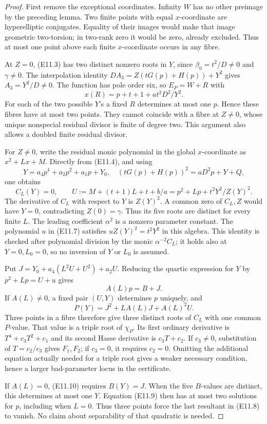 \begin{proof}
First remove the exceptional coordinates. Infinity $W$ has no other
preimage by the preceding lemma. Two finite points with equal
$x$-coordinate are hyperelliptic conjugates. Equality of their images
would make that image geometric two-torsion; in two-rank zero it would
be zero, already excluded. Thus at most one point above each finite
$x$-coordinate occurs in any fibre.

At $Z=0$, (E11.3) has two distinct nonzero roots in $Y$, since
$\beta_0=t^2/D\ne0$ and $\gamma\ne0$. The interpolation identity
$DA_3=Z(tG(p)+H(p))+Y^2$ gives $A_3=Y^2/D\ne0$.
The function has pole order six, so $E_P=W+R$ with
\[
 x(R)=p+t+1+at^2D^2/Y^2.
\]
For each of the two possible $Y$'s a fixed $R$ determines at most one
$p$. Hence these fibres have at most two points. They cannot coincide
with a fibre at $Z\ne0$, whose unique nonspecial residual divisor is
finite of degree two. This argument also allows a doubled finite
residual divisor.

For $Z\ne0$, write the residual monic polynomial in the global
$x$-coordinate as $x^2+Lx+M$. Directly from (E11.4), and using
\[
 Y=a_4p^4+a_2p^2+a_1p+Y_0,\quad
 (tG(p)+H(p))^2=aD^2p+Y+Q,
\]
one obtains
\[
 C_L(Y)=0,\qquad
 U:=M+(t+1)L+t+b/a=p^2+Lp+t^2Y^2/Z(Y)^2.       \tag{E11.9}
\]
The derivative of $C_L$ with respect to $Y$ is $Z(Y)^2$.
A common zero of $C_L,Z$ would have $Y=0$, contradicting
$Z(0)=\gamma$. Thus its five roots are distinct for every finite $L$.
The leading coefficient $\alpha^2$ is a nonzero parameter constant.
The polynomial $u$ in (E11.7) satisfies
$uZ(Y)^2=t^2Y^2$ in this algebra. This identity is checked after
polynomial division by the monic $\alpha^{-2}C_L$; it holds also at
$Y=0,L_0=0$, so no inversion of $Y$ or $L_0$ is assumed.

Put $J=Y_0+a_4(L^2U+U^2)+a_2U$.
Reducing the quartic expression for $Y$ by $p^2+Lp=U+u$ gives
\[
                  A(L)p=B+J.                  \tag{E11.10}
\]
If $A(L)\ne0$, a fixed pair $(U,Y)$ determines $p$ uniquely, and
\[
              P(Y)=J^2+LA(L)J+A(L)^2U.
\]
Three points in a fibre therefore give three distinct roots of $C_L$
with one common $P$-value. That value is a triple root of $\chi_P$.
Its first ordinary derivative is $T^4+c_3T^2+c_1$ and its second
Hasse derivative is $c_3T+c_2$. If $c_3\ne0$, substitution of
$T=c_2/c_3$ gives $F_1,F_2$; if $c_3=0$, it requires $c_2=0$.
Omitting the additional equation actually needed for a triple root
gives a weaker necessary condition, hence a larger bad-parameter locus
in the certificate.

If $A(L)=0$, (E11.10) requires $B(Y)=J$. When the five $B$-values
are distinct, this determines at most one $Y$. Equation (E11.9)
then has at most two solutions for $p$, including when $L=0$.
Thus three points force the last resultant in (E11.8) to vanish.
No claim about separability of that quadratic is needed.
\end{proof}

